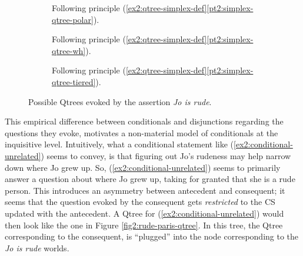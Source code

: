 \begin{exe}
	\ex
	\begin{xlist}
		\label{ex2:conditional-unrelated}
		\label{ex2:material-conditional-underlated}
	\end{xlist}
\end{exe}

\begin{figure}[H]
	\centering
	\begin{subfigure}[t]{.2\linewidth}
		\centering\scalebox{.85}{
		\begin{forest}
			[CS[Rude][$\neg$Rude]]
		\end{forest}}
		\caption{Following principle (\ref{ex2:qtree-simplex-def}\ref{pt2:simplex-qtree-polar}).}\label{fig2:rude-qtree-polar}
	\end{subfigure}
	\hfill
	\begin{subfigure}[t]{.75\linewidth}
		\centering\scalebox{.85}{
		\begin{forest}
			[CS[Rude$\wedge$Smart][$\neg$Rude$\wedge$Smart][Rude$\wedge$$\neg$Smart][$\neg$Rude$\wedge$$\neg$Smart]]
		\end{forest}}
		\caption{Following principle (\ref{ex2:qtree-simplex-def}\ref{pt2:simplex-qtree-wh}).}\label{fig2:rude-qtree-wh}
	\end{subfigure}
	
	\begin{subfigure}[t]{\linewidth}
		\centering\scalebox{.85}{
		\begin{forest}
			[CS[Good traits [$\neg$Rude$\wedge$Smart]][Bad traits [Rude$\wedge$$\neg$Smart]][Mixed traits [Rude$\wedge$Smart][$\neg$Rude$\wedge$$\neg$Smart]]]
		\end{forest}}
		\caption{Following principle (\ref{ex2:qtree-simplex-def}\ref{pt2:simplex-qtree-tiered}).}
	\end{subfigure}
	\caption{Possible Qtrees evoked by the assertion \textit{Jo is rude}.}\label{fig2:rude-qtrees}
\end{figure}


This empirical difference between conditionals and disjunctions regarding the questions they evoke, motivates a non-material model of conditionals at the inquisitive level. Intuitively, what a conditional statement like (\ref{ex2:conditional-unrelated}) seems to convey, is that figuring out Jo's rudeness may help narrow down where Jo grew up. So, (\ref{ex2:conditional-unrelated}) seems to primarily answer a question about where Jo grew up, taking for granted that she is a rude person. This introduces an asymmetry between antecedent and consequent; it seems that the question evoked by the consequent gets \textit{restricted} to the CS updated with the antecedent. A Qtree for (\ref{ex2:conditional-unrelated}) would then look like the one in Figure \ref{fig2:rude-paris-qtree}. In this tree, the Qtree corresponding to the consequent, is ``plugged'' into the node corresponding to the \textit{Jo is rude} worlds.

